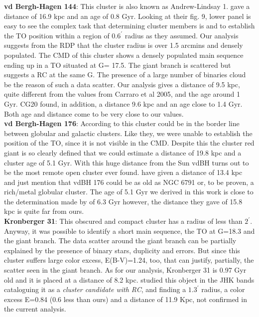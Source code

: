 \documentclass[draft]{aa}
\begin{document}
  \textbf{vd Bergh-Hagen 144}: This cluster is also known as Andrew-Lindsay 1.
  \cite{Carraro_2005_neglected} gave a distance of 16.9 kpc and an age of
  0.8 Gyr.  Looking at their fig. 9, lower panel is easy to see the complex task
  that determining cluster members is and to establish the TO position within a
  region of $0.6^{\prime}$ radius as they assumed.  Our analysis suggests from the
  RDP that the cluster radius is over 1.5 arcmins and densely populated.   The
  CMD of this cluster shows a densely populated main sequence ending up in a TO
  situated at G= 17.5. The giant branch is scattered but suggests a RC at the
  same G.  The presence of a large number of binaries cloud be the reason of
  such a data scatter. Our analysis gives a distance of 9.5 kpc, quite different
  from the values from Carraro et al 2005, and the age around 1 Gyr.
  CG20 found, in addition, a distance 9.6 kpc and an age close to 1.4
  Gyr. Both age and distance come to be very close to our values.\\

  \textbf{vd Bergh-Hagen 176}: According to \cite{Ortolani_1995} this cluster
  could be in the border line between globular and galactic clusters. Like
  they, we were unable to establish the position of the TO, since it is not visible
  in the CMD. Despite this the cluster red giant is so clearly defined that we
  could estimate a distance of 19.8 kpc and a cluster age of 5.1 Gyr. With this huge 
  distance from the Sun vdBH turns out to be the most remote open cluster ever found.
  \cite{Ortolani_1995} have given a distance of 13.4 kpc and just mention
  that vdBH 176 could be as old as NGC 6791 or, to be proven, a rich/metal
  globular cluster. The age of 5.1 Gyr we derived in this work is close
  to the determination made by \cite{Frinchaboy_2006} of 6.3 Gyr however,
  the distance they gave of 15.8 kpc is quite far from ours.\\

  \textbf{Kronberger 31}: This obscured and compact cluster has a radius
  of less than $2^{\prime}$. Anyway, it was possible to identify a short
  main sequence, the TO at G=18.3 and the giant branch. The data scatter
  around the giant branch can be partially explained by the presence of
  binary stars, duplicity and errors. But since this cluster suffers large
  color excess, E(B-V)=1.24, too, that can justify, partially, the scatter
  seen in the giant branch. As for our analysis, Kronberger 31 is 0.97 Gyr
  old and it is placed at a distance of 8.2 kpc. \cite{Kronberger_2006}
  studied this object in the JHK bands cataloguing it as a \emph{cluster
  candidate with RC}, and finding a $1.3^{\prime}$ radius, a color
  excess E=0.84 (0.6 less than ours) and a distance of 11.9 Kpc, not
  confirmed in the current analysis.\\
\end{document}
